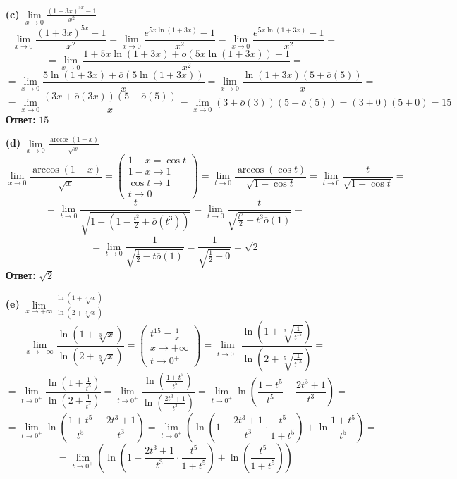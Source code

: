 \documentclass[a4paper]{article}
\newcommand{\mat}[1]{\begin{pmatrix} #1 \end{pmatrix}}
\renewcommand{\f}[2]{\frac{#1}{#2}}
\newcommand{\lm}[1]{\underset{#1}{\lim}}
\newcommand{\oo}{\overline{o}}
\begin{document}
\begin{enumerate}
\begin{enumerate}
        \item[\textbf{(c)}]$\lm{x \to 0}\f{(1+3x)^{5x} - 1}{x^2}$
        $$\lm{x \to 0}\f{(1+3x)^{5x} - 1}{x^2} = \lm{x \to 0}\f{e^{5x\ln(1+3x)} - 1}{x^2} = \lm{x \to 0}\f{e^{5x\ln(1+3x)} - 1}{x^2} = $$
        $$=\lm{x \to 0}\f{1 + 5x\ln(1+3x) + \oo(5x\ln(1+3x)) - 1}{x^2} =$$
        $$= \lm{x \to 0}\f{5\ln(1+3x) + \oo(5\ln(1+3x))}{x} = \lm{x \to 0}\f{\ln(1+3x)(5 + \oo(5))}{x} = $$
        $$=\lm{x \to 0}\f{(3x + \oo(3x))(5 + \oo(5))}{x} = \lm{x \to 0}(3 + \oo(3))(5 + \oo(5)) = (3+0)(5+0) = 15$$
        \textbf{Ответ: } $15$\\


        \item[\textbf{(d)}]$\lm{x \to 0}\f{\arccos(1-x)}{\sqrt{x}}$
        $$\lm{x \to 0}\f{\arccos(1-x)}{\sqrt{x}} = \mat{1-x = \cos{t} \\ 1-x \to 1 \\ \cos{t} \to 1 \\ t \to 0} = \lm{t \to 0}\f{\arccos(\cos{t})}{\sqrt{1-\cos{t}}} = \lm{t \to 0}\f{t}{\sqrt{1-\cos{t}}} = $$
        $$= \lm{t \to 0}\f{t}{\sqrt{1-(1 - \f{t^2}{2} + \oo(t^3))}} = \lm{t \to 0}\f{t}{\sqrt{ \f{t^2}{2} - t^3\oo(1)}} =$$
        $$= \lm{t \to 0}\f{1}{\sqrt{ \f{1}{2} - t\oo(1)}} = \f{1}{\sqrt{\f{1}{2} - 0}} = \sqrt{2}$$
        \textbf{Ответ: } $\sqrt{2}$\\

        \item[\textbf{(e)}]$\lm{x \to +\infty}\f{\ln(1+\sqrt[3]{x})}{\ln(2+\sqrt[5]{x})}$
        $$\lm{x \to +\infty}\f{\ln(1+\sqrt[3]{x})}{\ln(2+\sqrt[5]{x})} = \mat{t^{15} = \f{1}{x} \\ x \to +\infty \\ t \to 0^+} = \lm{ t \to 0^+}\f{\ln(1+\sqrt[3]{\f{1}{t^{15}}})}{\ln(2+\sqrt[5]{\f{1}{t^{15}}})}=$$
        $$ = \lm{ t \to 0^+}\f{\ln(1+\f{1}{t^5})}{\ln(2+\f{1}{t^{3}})} = \lm{ t \to 0^+}\f{\ln(\f{1+t^5}{t^5})}{\ln(\f{2t^3+1}{t^{3}})} =\lm{ t \to 0^+}\ln(\f{1+t^5}{t^5} - \f{2t^3+1}{t^{3}}) = $$
        $$= \lm{ t \to 0^+}\ln(\f{1+t^5}{t^5} - \f{2t^3+1}{t^{3}}) = \lm{ t \to 0^+}(\ln(1 - \f{2t^3+1}{t^{3}}\cdot\f{t^5}{1+t^5}) + \ln{\f{1+t^5}{t^5}}) = $$
        $$ = \lm{ t \to 0^+}(\ln(1 - \f{2t^3+1}{t^{3}}\cdot\f{t^5}{1+t^5}) + \ln(\f{t^5}{1+t^5}))$$
    \end{enumerate}
\end{enumerate}
\end{document}
